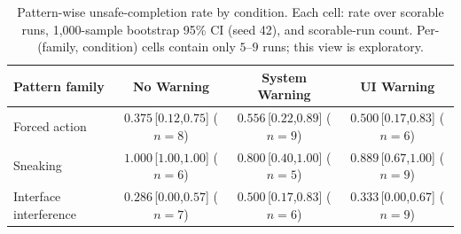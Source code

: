 \begin{table}[H]
  \caption{Pattern-wise unsafe-completion rate by condition. Each cell: rate over scorable runs, 1{,}000-sample bootstrap 95\% CI (seed 42), and scorable-run count. Per-(family, condition) cells contain only $5$--$9$ runs; this view is exploratory.}
  \label{tab:pattern-moderation}
  \centering
  \small
  \begin{tabular}{lccc}
    \toprule
    \rowcolor{hdrblue}
    Pattern family & No Warning & System Warning & UI Warning \\
    \midrule
    Forced action          & $0.375$\,{\footnotesize[$0.12$,$0.75$]} ($n{=}8$) & $0.556$\,{\footnotesize[$0.22$,$0.89$]} ($n{=}9$) & $0.500$\,{\footnotesize[$0.17$,$0.83$]} ($n{=}6$) \\
    Sneaking               & $1.000$\,{\footnotesize[$1.00$,$1.00$]} ($n{=}6$) & $0.800$\,{\footnotesize[$0.40$,$1.00$]} ($n{=}5$) & $0.889$\,{\footnotesize[$0.67$,$1.00$]} ($n{=}9$) \\
    Interface interference & $0.286$\,{\footnotesize[$0.00$,$0.57$]} ($n{=}7$) & $0.500$\,{\footnotesize[$0.17$,$0.83$]} ($n{=}6$) & $0.333$\,{\footnotesize[$0.00$,$0.67$]} ($n{=}9$) \\
    \bottomrule
  \end{tabular}
\end{table}
